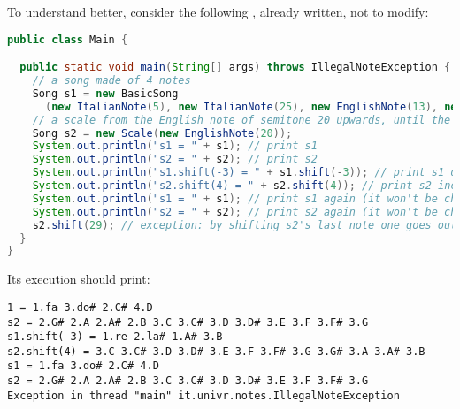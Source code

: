 \documentclass[12pt]{article}
\def\codesize{\smaller}
\def\<#1>{\codeid{#1}}
\newcommand{\codeid}[1]{\ifmmode{\mbox{\codesize\ttfamily{#1}}}\else{\codesize\ttfamily #1}\fi}
\begin{document}
To understand better, consider the following \<Main.java>, already written, not to modify:
%
\begin{lstlisting}[language=Java]
public class Main {

  public static void main(String[] args) throws IllegalNoteException {
    // a song made of 4 notes
    Song s1 = new BasicSong
      (new ItalianNote(5), new ItalianNote(25), new EnglishNote(13), new EnglishNote(38));
    // a scale from the English note of semitone 20 upwards, until the English note with semitone 31
    Song s2 = new Scale(new EnglishNote(20));
    System.out.println("s1 = " + s1); // print s1
    System.out.println("s2 = " + s2); // print s2
    System.out.println("s1.shift(-3) = " + s1.shift(-3)); // print s1 decreased by three semitones
    System.out.println("s2.shift(4) = " + s2.shift(4)); // print s2 increased by four semitones
    System.out.println("s1 = " + s1); // print s1 again (it won't be changed)
    System.out.println("s2 = " + s2); // print s2 again (it won't be changed)
    s2.shift(29); // exception: by shifting s2's last note one goes outside the bounds 0...MAX_SEMITONE
  }
}
\end{lstlisting}
%
Its execution should print:
%
\begin{mdframed}[backgroundcolor=lightred]
  {\small\begin{verbatim}
1 = 1.fa 3.do# 2.C# 4.D
s2 = 2.G# 2.A 2.A# 2.B 3.C 3.C# 3.D 3.D# 3.E 3.F 3.F# 3.G
s1.shift(-3) = 1.re 2.la# 1.A# 3.B
s2.shift(4) = 3.C 3.C# 3.D 3.D# 3.E 3.F 3.F# 3.G 3.G# 3.A 3.A# 3.B
s1 = 1.fa 3.do# 2.C# 4.D
s2 = 2.G# 2.A 2.A# 2.B 3.C 3.C# 3.D 3.D# 3.E 3.F 3.F# 3.G
Exception in thread "main" it.univr.notes.IllegalNoteException
\end{verbatim}}
\end{mdframed}
\end{document}
